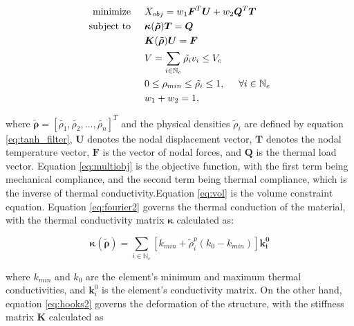 \documentclass[../main.tex]{subfiles}
\begin{document}
\begin{align}
  \text{minimize}  & \hspace{0.5cm} X_{obj} = w_1 \bm{F}^T \bm{U} + w_2 \bm{Q}^T \bm{T}  \label{eq:multiobj}\\ 
  \text{subject to} & \hspace{0.5cm} \bm{\kappa}(\bm{\tilde{\rho}}) \bm{T} = \bm{Q} \label{eq:fourier2} \\
                    &  \hspace{0.5cm} \bm{K}(\bm{\tilde{\rho}}){\bm{U}} = \bm{F} \label{eq:hooks2} \\
    & \hspace{0.5cm} V = \sum _{i \in \mathbb{N}_e } \tilde{\rho_i} v_i \leq V_c \label{eq:vol} \\ 
    & \hspace{0.5cm} 0 \leq \rho_{min} \leq \tilde{\rho_i} \leq 1, \hspace{0.5cm} \forall i \in \mathbb{N}_e  \\
    & \hspace{0.5cm} w_1 + w_2 = 1,  \label{eq:multiobj_end}
 \end{align}

 where $\bm{\tilde{\rho}} = [\tilde{\rho_1}, \tilde{\rho_2}, ... , \tilde{\rho_n}]^T$ and the physical densities $\tilde{\rho}_i$ are defined by equation \ref{eq:tanh_filter}, $\bm{U}$ denotes the nodal displacement vector, $\bm{T}$ denotes the nodal temperature vector, $\bm{F}$ is the vector of nodal forces, and $\bm{Q}$ is the thermal load vector. Equation \ref{eq:multiobj} is the objective function, with the first term being mechanical compliance, and the second term being thermal compliance, which is the inverse of thermal conductivity.Equation \ref{eq:vol} is the volume constraint equation. Equation \ref{eq:fourier2} governs the thermal conduction of the material, with the thermal conductivity matrix $\bm{\kappa}$ calculated as:

\begin{equation}
  \bm{\kappa}(\bm{\tilde{\rho}}) = \sum_{i \in \mathbb{N}_e}[k_{min} + \tilde{\rho}_i^p(k_0 - k_{min})]\bm{k_i^0}
\label{eq:globalcond}
\end{equation}

where $k_{min}$ and $k_0$ are the element's minimum and maximum thermal conductivities, and $\bm{k}_i^0$ is the element's conductivity matrix. On the other hand, equation \ref{eq:hooks2} governs the deformation of the structure, with the stiffness matrix $\bm{K}$ calculated as
\end{document}
